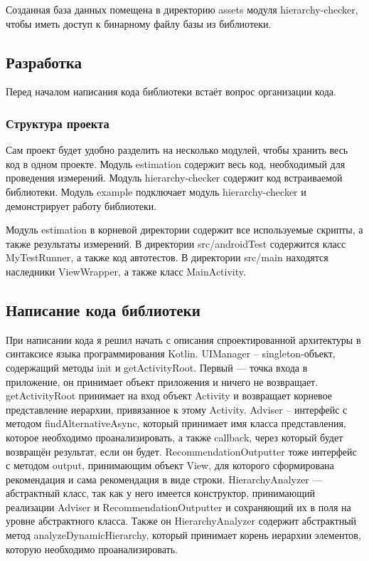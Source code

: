 \documentclass[a4paper,14pt]{extarticle} %
\begin{document}
	Созданная база данных помещена в директорию assets модуля hierarchy-checker, чтобы иметь доступ к бинарному файлу базы из библиотеки.

	\subsection{Разработка}
	
	Перед началом написания кода библиотеки встаёт вопрос организации кода.
	
	\subsubsection{Структура проекта}
	
	Сам проект будет удобно разделить на несколько модулей, чтобы хранить весь код в одном проекте. Модуль estimation содержит весь код, необходимый для проведения измерений. Модуль hierarchy-checker содержит код встраиваемой библиотеки. Модуль example подключает модуль hierarchy-checker и демонстрирует работу библиотеки.
	
	Модуль estimation в корневой директории содержит все используемые скрипты, а также результаты измерений. В директории src/androidTest содержится класс MyTestRunner, а также код автотестов. В директории src/main находятся наследники ViewWrapper, а также класс MainActivity.
	
	\subsection{Написание кода библиотеки}
	
	При написании кода я решил начать с описания спроектированной архитектуры в синтаксисе языка программирования Kotlin. UIManager – singleton-объект, содержащий методы init и getActivityRoot. Первый ---  точка входа в приложение, он принимает объект приложения и ничего не возвращает. getActivityRoot принимает на вход объект Activity и возвращает корневое представление иерархии, привязанное к этому Activity. Adviser – интерфейс с методом findAlternativeAsync, который принимает имя класса представления, которое необходимо проанализировать, а также callback, через который будет возвращён результат, если он будет. RecommendationOutputter тоже интерфейс с методом output, принимающим объект View, для которого сформирована рекомендация и сама рекомендация в виде строки. HierarchyAnalyzer ---  абстрактный класс, так как у него имеется конструктор, принимающий реализации Adviser и RecommendationOutputter и сохраняющий их в поля на уровне абстрактного класса. Также он HierarchyAnalyzer содержит абстрактный метод analyzeDynamicHierarchy, который принимает корень иерархии элементов, которую необходимо проанализировать.
	
\end{document}
